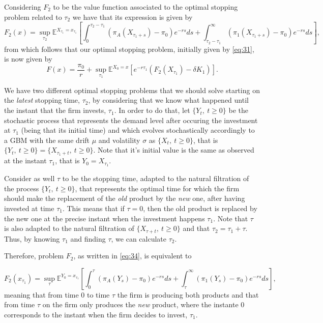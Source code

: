 Considering $F_2$ to be the value function associated to the optimal stopping problem related to $\tau_2$ we have that its expression is given by
\begin{equation}
F_2(x)=\sup_{\tau_2} \mathds{E}^{X_{\tau_1}=x_{\tau_1}} \left[ \int_0^{\tau_2-\tau_1} \left( \pi_A(X_{\tau_1+s})-\pi_0 \right) e^{-rs}ds + \int_{\tau_2-\tau_1}^\infty \left( \pi_1(X_{\tau_1+s})-\pi_0 \right) e^{-rs}ds  \right],
\label{eq:34}
\end{equation}
from which follows that our optimal stopping problem, initially given by \eqref{eq:31}, is now given by
\begin{equation}
F(x)=\frac{\pi_0}{r}+\sup _{\tau_1} \mathds{E}^{X_0=x} \left[ e^{-r \tau_1}(F_2(X_{\tau_1})-\delta K_1 )\right].
\label{eq:35}
\end{equation}

We have two different optimal stopping problems that we should solve starting on the \textit{latest} stopping time, $\tau_2$, by considering that we know what happened until the instant that the firm invests, $\tau_1$. In order to do that, let $\{Y_t, \ t\geq0\}$ be the stochastic process that represents the demand level after occuring the investment at $\tau_1$ (being that its initial time) and which evolves stochastically accordingly to a GBM with the same drift $\mu$ and volatility $\sigma$ as $\{X_t, \ t\geq0\}$, that is $\{Y_t, \ t\geq0\} = \{X_{\tau_1+t}, \ t\geq0\}$. Note that it's initial value is the same as observed at the instant $\tau_1$, that is $Y_0=X_{\tau_1}$.

Consider as well $\tau$ to be the stopping time, adapted to the natural filtration of the process $\{Y_t, \ t\geq0\}$, that represents the optimal time for which the firm should make the replacement of the \textit{old} product by the \textit{new} one, after having invested at time $\tau_1$. This means that  if $\tau=0$, then the old product is replaced by the new one at the precise instant when the investment happens $\tau_1$. Note that $\tau$ is also adapted to the natural filtration of $\{ X_{\tau+t},\ t\geq0 \}$ and that $\tau_2=\tau_1+\tau$. Thus, by knowing $\tau_1$ and finding $\tau$, we can calculate $\tau_2$.

Therefore, problem $F_2$, as written in \eqref{eq:34}, is equivalent to

\begin{equation}
F_2(x_{\tau_1})=\sup_{\tau} \mathds{E}^{Y_0=x_{\tau_1}} \left[ \int_0^{\tau} \left( \pi_A(Y_s)-\pi_0 \right) e^{-rs}ds + \int_{\tau}^\infty \left( \pi_1(Y_s)-\pi_0 \right) e^{-rs}ds  \right],
\label{eq:3s2}
\end{equation}
meaning that from time 0 to time $\tau$ the firm is producing both products and that from time $\tau$ on the firm only produces the \textit{new} product, where the instante 0 corresponds to the instant when the firm decides to invest, $\tau_1$.

